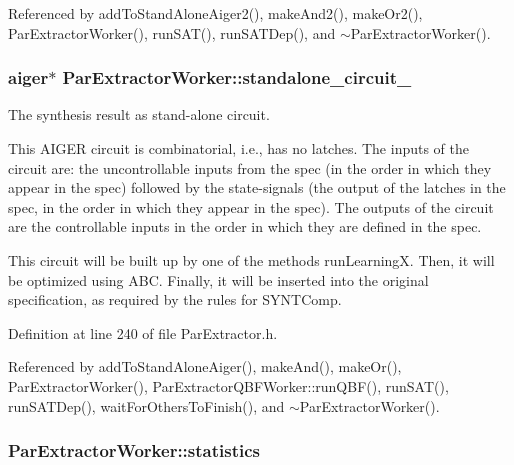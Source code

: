 Referenced by add\-To\-Stand\-Alone\-Aiger2(), make\-And2(), make\-Or2(), Par\-Extractor\-Worker(), run\-S\-A\-T(), run\-S\-A\-T\-Dep(), and $\sim$\-Par\-Extractor\-Worker().

\hypertarget{classParExtractorWorker_a233a7f99946695b0640e76ead6932fbb}{
\subsubsection[{standalone\-\_\-circuit\-\_\-}]{\setlength{\rightskip}{0pt plus 5cm}aiger$\ast$ Par\-Extractor\-Worker\-::standalone\-\_\-circuit\-\_\-}}\label{classParExtractorWorker_a233a7f99946695b0640e76ead6932fbb}


The synthesis result as stand-\/alone circuit. 

This A\-I\-G\-E\-R circuit is combinatorial, i.\-e., has no latches. The inputs of the circuit are\-: the uncontrollable inputs from the spec (in the order in which they appear in the spec) followed by the state-\/signals (the output of the latches in the spec, in the order in which they appear in the spec). The outputs of the circuit are the controllable inputs in the order in which they are defined in the spec.

This circuit will be built up by one of the methods run\-Learning\-X. Then, it will be optimized using A\-B\-C. Finally, it will be inserted into the original specification, as required by the rules for S\-Y\-N\-T\-Comp. 

Definition at line 240 of file Par\-Extractor.\-h.



Referenced by add\-To\-Stand\-Alone\-Aiger(), make\-And(), make\-Or(), Par\-Extractor\-Worker(), Par\-Extractor\-Q\-B\-F\-Worker\-::run\-Q\-B\-F(), run\-S\-A\-T(), run\-S\-A\-T\-Dep(), wait\-For\-Others\-To\-Finish(), and $\sim$\-Par\-Extractor\-Worker().

\hypertarget{classParExtractorWorker_a5e23f373a7959b56eb6f93036f98a1b1}{
\subsubsection[{statistics}]{ Par\-Extractor\-Worker\-::statistics}}\label{classParExtractorWorker_a5e23f373a7959b56eb6f93036f98a1b1}


